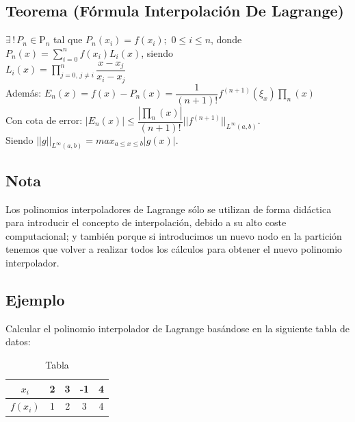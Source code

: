\documentclass[12pt,a4paper,oneside]{scrbook}
\begin{document}
\subsection*{Teorema (Fórmula Interpolación De Lagrange)}
$\exists \,!\,P_n\in\mathrm{P}_n$ tal que $P_n(x_i)=f(x_i);\,\,0\leq i\leq n$, donde $P_n(x)=\sum\limits_{i=0}^n f(x_i)L_i(x)$, siendo\\
$L_i(x)=\prod\limits_{j=0,\,j\neq i}^n \dfrac{x-x_j}{x_i-x_j}$\\
Además: $E_n(x)=f(x)-P_n(x)=\dfrac{1}{(n+1)!}f^{(n+1)}(\xi_x)\prod_n (x)$\\
Con cota de error: $|E_n(x)|\leq \dfrac{|\prod_n (x)|}{(n+1)!}|| f^{(n+1)}||_{L^\infty (a,b)}$.\\
Siendo $|| g ||_{L^\infty (a,b)}=max_{a\leq x\leq b} |g(x)|$.
\subsection*{Nota}
Los polinomios interpoladores de Lagrange sólo se utilizan de forma didáctica para introducir el concepto de interpolación, debido a su alto coste computacional; y también porque si introducimos un nuevo nodo en la partición tenemos que volver a realizar todos los cálculos para obtener el nuevo polinomio interpolador.
\subsection*{Ejemplo}
Calcular el polinomio interpolador de Lagrange basándose en la siguiente tabla de datos:
\begin{table}[h!]
    \centering
    \begin{tabular}{|c||c|c|c|c|}
    \hline
        $x_i$ & 2 & 3 & -1 & 4 \\
        \hline
        $f(x_i)$ & 1 & 2 & 3 & 4 \\
    \hline
    \end{tabular}
        \caption{Tabla}
    \label{tab:my_label}
\end{table}
\end{document}
